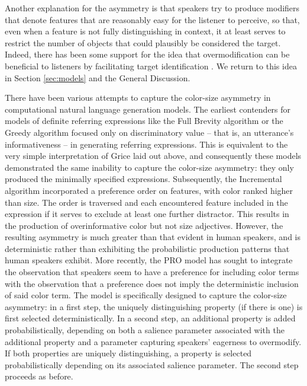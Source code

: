 \documentclass[11pt]{article}
\newcommand{\jd}[1]{\textcolor{Red}{[jd: #1]}}
\newcommand{\sectionref}[1]{Section \ref{#1}}
\begin{document}
Another explanation for the asymmetry is that speakers try to produce modifiers that denote features that are reasonably easy for the listener to perceive, so that, even when a feature is not fully distinguishing in context, it at least serves to restrict the number of objects that could plausibly be considered the target. Indeed, there has been some support for the idea that overmodification can be beneficial to listeners by facilitating target identification \cite{Arts2011, rubiofernandez2016, Paraboni2007}. We return to this idea in \sectionref{sec:models} and the General Discussion.


There have been various attempts to capture the color-size asymmetry in computational natural language generation models. The earliest contenders for models of definite referring expressions like the Full Brevity algorithm \cite{Dale1989} or the Greedy algorithm \cite{Dale1989} focused only on discriminatory value -- that is, an utterance's informativeness -- in generating referring expressions. This is equivalent to the very simple interpretation of Grice laid out above, and consequently these models demonstrated the same inability to capture the color-size asymmetry: they only produced the minimally specified expressions. Subsequently, the Incremental algorithm \cite{dale1995} incorporated a preference order on features, with color ranked higher than size. The order is traversed and each encountered feature included in the expression if it serves to exclude at least one further distractor. This results in the production of overinformative color but not size adjectives. However, the resulting asymmetry is much greater than that evident in human speakers, and is deterministic rather than exhibiting the probabilistic production patterns that human speakers exhibit. More recently, the PRO model \cite{GattEtAl2013} has sought to integrate the observation that speakers seem to have a preference for including color terms with the observation that a preference does not imply the deterministic inclusion of said color term. The model is specifically designed to capture the color-size asymmetry: in a first step, the uniquely distinguishing property (if there is one) is first selected deterministically. In a second step, an additional property is added probabilistically, depending on both a salience parameter associated with the additional property and a parameter capturing speakers' eagerness to overmodify. If both properties are uniquely distinguishing, a property is selected probabilistically depending on its associated salience parameter. The second step proceeds as before.
\end{document}
